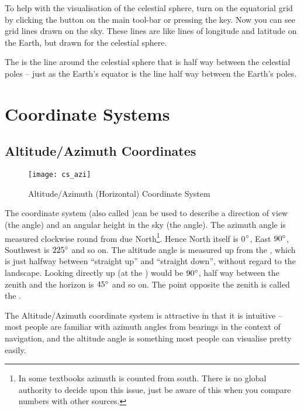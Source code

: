 To help with the visualisation of the celestial sphere, turn on the
equatorial grid by clicking the button on the main tool-bar or pressing
the  key. Now you can see grid lines drawn on the sky. These
lines are like lines of longitude and latitude on the Earth, but drawn
for the celestial sphere.

The  is the line around the celestial sphere
that is half way between the celestial poles -- just as the Earth's
equator is the line half way between the Earth's poles.




\section{Coordinate Systems}
\label{sec:Concepts:CoordinateSystems}

\subsection{Altitude/Azimuth Coordinates}
\label{sec:Concepts:AltAz}

\begin{figure}[ht]
\centering\texttt{[image: cs\_azi]}
\caption{Altitude/Azimuth (Horizontal) Coordinate System}
\label{fig:AltAz}
\end{figure}

The  coordinate system (also called
)can be used to describe a
direction of view (the  angle) and an angular
height in the sky (the  angle). The azimuth angle
is measured clockwise round from due North\footnote{In some textbooks
  azimuth is counted from south. There is no global authority to
  decide upon this issue, just be aware of this when you compare
  numbers with other sources.}. Hence North itself is 0$\degree$, East
$90\degree$, Southwest is $225\degree$ and so on.  The altitude angle
is measured up from the , which is
just halfway between ``straight up'' and ``straight down'', without
regard to the landscape. Looking directly up (at the
) would be $90\degree$, half way between the zenith
and the horizon is $45\degree$ and so on. The point opposite the
zenith is called the .

The Altitude/Azimuth coordinate system is attractive in that it is
intuitive -- most people are familiar with azimuth angles from bearings
in the context of navigation, and the altitude angle is something most
people can visualise pretty easily.

